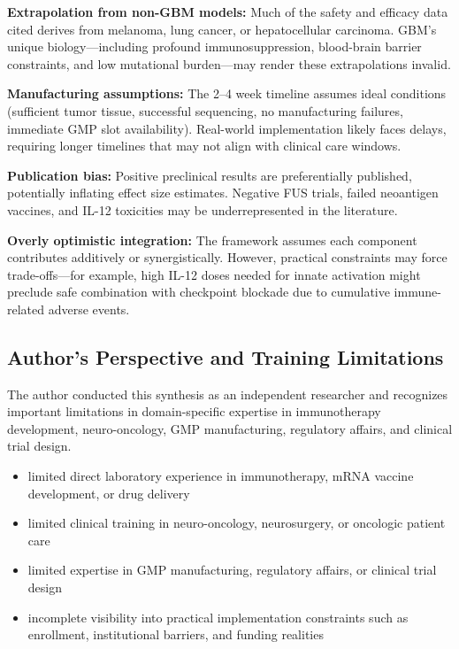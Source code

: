 \documentclass[12pt]{article}
\begin{document}
\textbf{Extrapolation from non-GBM models:} Much of the safety and efficacy data cited derives from melanoma, lung cancer, or hepatocellular carcinoma. GBM's unique biology—including profound immunosuppression, blood-brain barrier constraints, and low mutational burden—may render these extrapolations invalid.

\textbf{Manufacturing assumptions:} The 2--4 week timeline assumes ideal conditions (sufficient tumor tissue, successful sequencing, no manufacturing failures, immediate GMP slot availability). Real-world implementation likely faces delays, requiring longer timelines that may not align with clinical care windows.

\textbf{Publication bias:} Positive preclinical results are preferentially published, potentially inflating effect size estimates. Negative FUS trials, failed neoantigen vaccines, and IL-12 toxicities may be underrepresented in the literature.

\textbf{Overly optimistic integration:} The framework assumes each component contributes additively or synergistically. However, practical constraints may force trade-offs—for example, high IL-12 doses needed for innate activation might preclude safe combination with checkpoint blockade due to cumulative immune-related adverse events.

\subsection{Author's Perspective and Training Limitations}
The author conducted this synthesis as an independent researcher and recognizes important limitations in domain-specific expertise in immunotherapy development, neuro-oncology, GMP manufacturing, regulatory affairs, and clinical trial design.

\begin{itemize}[leftmargin=*,noitemsep]
\item limited direct laboratory experience in immunotherapy, mRNA vaccine development, or drug delivery
\item limited clinical training in neuro-oncology, neurosurgery, or oncologic patient care
\item limited expertise in GMP manufacturing, regulatory affairs, or clinical trial design
\item incomplete visibility into practical implementation constraints such as enrollment, institutional barriers, and funding realities
\end{itemize}
\end{document}
